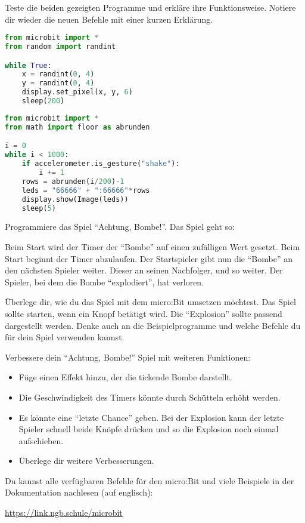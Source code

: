 \documentclass[10pt, a4paper]{scrartcl}
\begin{document}
\begin{aufgabe}
	Teste die beiden gezeigten Programme und erkläre ihre Funktionsweise. Notiere dir wieder die neuen Befehle mit einer kurzen Erklärung.
	\vspace{-1em}\setlength{\columnsep}{.8cm}
	\begin{multicols}{2}
	\begin{lstlisting}[language=Python]
from microbit import *
from random import randint

while True:
	x = randint(0, 4)
	y = randint(0, 4)
	display.set_pixel(x, y, 6)
	sleep(200)
	\end{lstlisting}
	
	\columnbreak
	
	\begin{lstlisting}[language=Python]
from microbit import *
from math import floor as abrunden

i = 0
while i < 1000:
    if accelerometer.is_gesture("shake"):
        i += 1
    rows = abrunden(i/200)-1
    leds = "66666" + ":66666"*rows
    display.show(Image(leds))
    sleep(5)
	\end{lstlisting}
	\end{multicols}
\end{aufgabe}

\begin{aufgabe}
	Programmiere das Spiel \enquote{Achtung, Bombe!}. Das Spiel geht so: 
	
	\begin{rahmen}
	Beim Start wird der Timer der \enquote{Bombe} auf einen zufälligen Wert gesetzt. Beim Start beginnt der Timer abzulaufen. Der Startspieler gibt nun die \enquote{Bombe} an den nächsten Spieler weiter. Dieser an seinen Nachfolger, und so weiter. Der Spieler, bei dem die Bombe \enquote{explodiert}, hat verloren.
	\end{rahmen}
	
	Überlege dir, wie du das Spiel mit dem micro:Bit umsetzen möchtest. Das Spiel sollte starten, wenn ein Knopf betätigt wird. Die \enquote{Explosion} sollte passend dargestellt werden. Denke auch an die Beispielprogramme und welche Befehle du für dein Spiel verwenden kannst.
\end{aufgabe}

\begin{aufgabe}
	Verbessere dein \enquote{Achtung, Bombe!} Spiel mit weiteren Funktionen:
	\begin{itemize}
		\item Füge einen Effekt hinzu, der die tickende Bombe darstellt.
		\item Die Geschwindigkeit des Timers könnte durch Schütteln erhöht werden.
		\item Es könnte eine \enquote{letzte Chance} geben. Bei der Explosion kann der letzte Spieler schnell beide Knöpfe drücken und so die Explosion noch einmal aufschieben.
		\item Überlege dir weitere Verbesserungen.
	\end{itemize}
\end{aufgabe}

\begin{infobox}
Du kannst alle verfügbaren Befehle für den micro:Bit und viele Beispiele in der Dokumentation nachlesen (auf englisch): 

\url{https://link.ngb.schule/microbit}
\end{infobox}
\end{document}
